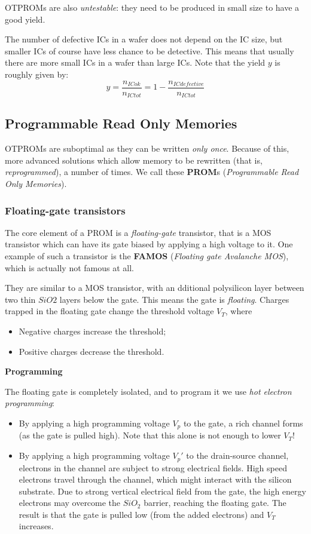 \documentclass[a4paper,11pt]{article}
\begin{document}
OTPROMs are also \textit{untestable}: they need to be produced in small size to have a good yield.

The number of defective ICs in a wafer does not depend on the IC size, but smaller ICs of course have less chance to be detective.
This means that usually there are more small ICs in a wafer than large ICs.
Note that the yield $y$ is roughly given by:
$$
	y = \frac{n_{ICok}}{n_{ICtot}} = 1 - \frac{n_{ICdefective}}{n_{ICtot}}
$$

\subsection{Programmable Read Only Memories}

OTPROMs are suboptimal as they can be written \textit{only once}.
Because of this, more advanced solutions which allow memory to be rewritten (that is, \textit{reprogrammed}), a number of times.
We call these \textbf{PROM}s (\textit{Programmable Read Only Memories}).

\subsubsection{Floating-gate transistors}

The core element of a PROM is a \textit{floating-gate} transistor, that is a MOS transistor which can have its gate biased by applying a high voltage to it.
One example of such a transistor is the \textbf{FAMOS} (\textit{Floating gate Avalanche MOS}), which is actually not famous at all.

They are similar to a MOS transistor, with an dditional polysilicon layer between two thin $SiO2$ layers below the gate.
This means the gate is \textit{floating}.
Charges trapped in the floating gate change the threshold voltage $V_T$, where
\begin{itemize}
	\item
	      Negative charges increase the threshold;
	\item
	      Positive charges decrease the threshold.
\end{itemize}

\textbf{\textsf{Programming}}

The floating gate is completely isolated, and to program it we use \textit{hot electron programming}:
\begin{itemize}
	\item By applying a high programming voltage $V_p$ to the gate, a rich channel forms (as the gate is pulled high). Note that this alone is not enough to lower $V_T$!

	\item By applying a high programming voltage $V_p'$ to the drain-source channel, electrons in the channel are subject to strong electrical fields.
	      High speed electrons travel through the channel, which might interact with the silicon substrate. Due to strong vertical electrical field from the gate, the high energy electrons may overcome the $SiO_2$ barrier, reaching the floating gate. The result is that the gate is pulled low (from the added electrons) and $V_T$ increases.
\end{itemize}
\end{document}
